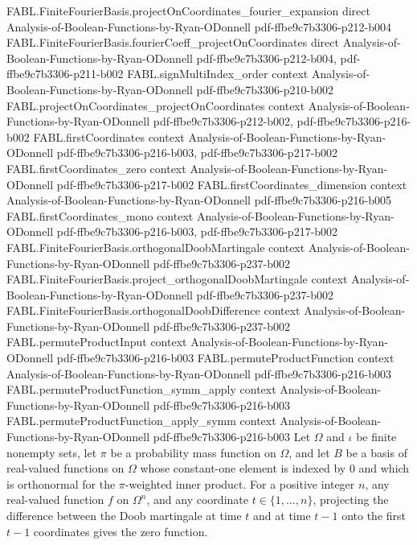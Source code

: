 \begin{theorem}
\proofstep
  {FABL.FiniteFourierBasis.projectOnCoordinates_fourier_expansion}
  {direct}
  {Analysis-of-Boolean-Functions-by-Ryan-ODonnell}
  {pdf-ffbe9c7b3306-p212-b004}
\proofstep
  {FABL.FiniteFourierBasis.fourierCoeff_projectOnCoordinates}
  {direct}
  {Analysis-of-Boolean-Functions-by-Ryan-ODonnell}
  {pdf-ffbe9c7b3306-p212-b004,
    pdf-ffbe9c7b3306-p211-b002}
\proofstep
  {FABL.signMultiIndex_order}
  {context}
  {Analysis-of-Boolean-Functions-by-Ryan-ODonnell}
  {pdf-ffbe9c7b3306-p210-b002}
\proofstep
  {FABL.projectOnCoordinates_projectOnCoordinates}
  {context}
  {Analysis-of-Boolean-Functions-by-Ryan-ODonnell}
  {pdf-ffbe9c7b3306-p212-b002,
    pdf-ffbe9c7b3306-p216-b002}
\proofstep
  {FABL.firstCoordinates}
  {context}
  {Analysis-of-Boolean-Functions-by-Ryan-ODonnell}
  {pdf-ffbe9c7b3306-p216-b003,
    pdf-ffbe9c7b3306-p217-b002}
\proofstep
  {FABL.firstCoordinates_zero}
  {context}
  {Analysis-of-Boolean-Functions-by-Ryan-ODonnell}
  {pdf-ffbe9c7b3306-p217-b002}
\proofstep
  {FABL.firstCoordinates_dimension}
  {context}
  {Analysis-of-Boolean-Functions-by-Ryan-ODonnell}
  {pdf-ffbe9c7b3306-p216-b005}
\proofstep
  {FABL.firstCoordinates_mono}
  {context}
  {Analysis-of-Boolean-Functions-by-Ryan-ODonnell}
  {pdf-ffbe9c7b3306-p216-b003,
    pdf-ffbe9c7b3306-p217-b002}
\proofstep
  {FABL.FiniteFourierBasis.orthogonalDoobMartingale}
  {context}
  {Analysis-of-Boolean-Functions-by-Ryan-ODonnell}
  {pdf-ffbe9c7b3306-p237-b002}
\proofstep
  {FABL.FiniteFourierBasis.project_orthogonalDoobMartingale}
  {context}
  {Analysis-of-Boolean-Functions-by-Ryan-ODonnell}
  {pdf-ffbe9c7b3306-p237-b002}
\proofstep
  {FABL.FiniteFourierBasis.orthogonalDoobDifference}
  {context}
  {Analysis-of-Boolean-Functions-by-Ryan-ODonnell}
  {pdf-ffbe9c7b3306-p237-b002}
\proofstep
  {FABL.permuteProductInput}
  {context}
  {Analysis-of-Boolean-Functions-by-Ryan-ODonnell}
  {pdf-ffbe9c7b3306-p216-b003}
\proofstep
  {FABL.permuteProductFunction}
  {context}
  {Analysis-of-Boolean-Functions-by-Ryan-ODonnell}
  {pdf-ffbe9c7b3306-p216-b003}
\proofstep
  {FABL.permuteProductFunction_symm_apply}
  {context}
  {Analysis-of-Boolean-Functions-by-Ryan-ODonnell}
  {pdf-ffbe9c7b3306-p216-b003}
\proofstep
  {FABL.permuteProductFunction_apply_symm}
  {context}
  {Analysis-of-Boolean-Functions-by-Ryan-ODonnell}
  {pdf-ffbe9c7b3306-p216-b003}
Let $\Omega$ and $\iota$ be finite nonempty sets, let $\pi$ be a probability mass
function on $\Omega$, and let $B$ be a basis of real-valued functions on $\Omega$ whose
constant-one element is indexed by $0$ and which is orthonormal for the $\pi$-weighted
inner product. For a positive integer $n$, any real-valued function $f$ on $\Omega^n$,
and any coordinate $t\in\{1,\ldots,n\}$, projecting the difference between the Doob
martingale at time $t$ and at time $t-1$ onto the first $t-1$ coordinates gives the zero
function.
\end{theorem}

